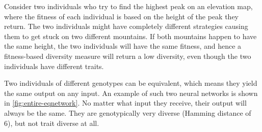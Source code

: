 Consider two individuals who try to find the highest peak on an elevation map, where the fitness of each individual is based on the height of the peak they return.
The two individuals might have completely different strategies causing them to get stuck on two different mountains.
If both mountains happen to have the same height, the two individuals will have the same fitness, and hence a fitness-based diversity measure will return a low diversity, even though the two individuals have different traits.

Two individuals of different genotypes can be equivalent, which means they yield the same output on any input.
An example of such two neural networks is shown in \cref{fig:entire-eqnetwork}.
No matter what input they receive, their output will always be the same.
They are genotypically very diverse (Hamming distance of 6), but not trait diverse at all.
%

%

